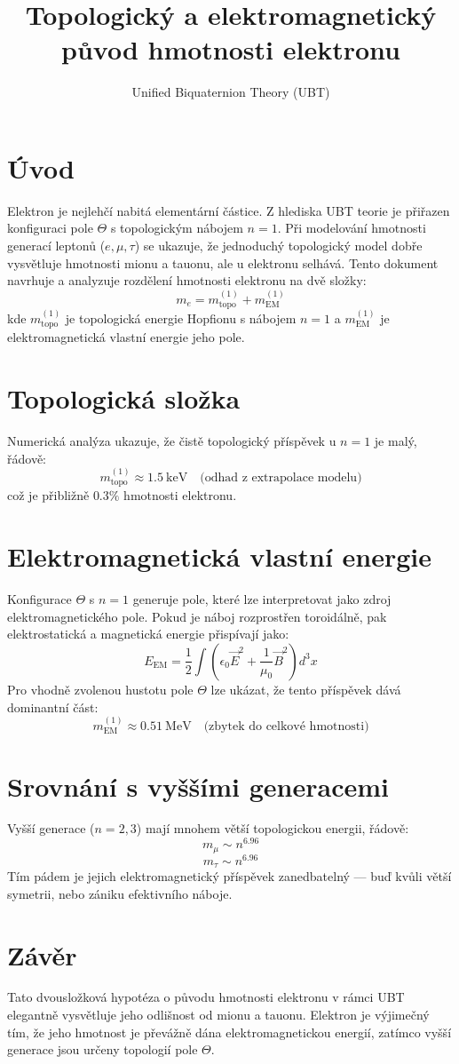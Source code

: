 \documentclass[12pt]{article}
\title{Topologický a elektromagnetický původ hmotnosti elektronu}
\author{Unified Biquaternion Theory (UBT)}
\date{}
\begin{document}
\maketitle

\section*{Úvod}
Elektron je nejlehčí nabitá elementární částice. Z hlediska UBT teorie je přiřazen konfiguraci pole $\Theta$ s topologickým nábojem $n=1$. Při modelování hmotnosti generací leptonů ($e, \mu, \tau$) se ukazuje, že jednoduchý topologický model dobře vysvětluje hmotnosti mionu a tauonu, ale u elektronu selhává. Tento dokument navrhuje a analyzuje rozdělení hmotnosti elektronu na dvě složky:
\[
m_e = m_{\text{topo}}^{(1)} + m_{\text{EM}}^{(1)}
\]
kde $m_{\text{topo}}^{(1)}$ je topologická energie Hopfionu s nábojem $n=1$ a $m_{\text{EM}}^{(1)}$ je elektromagnetická vlastní energie jeho pole.

\section*{Topologická složka}
Numerická analýza ukazuje, že čistě topologický příspěvek u $n=1$ je malý, řádově:
\[
m_{\text{topo}}^{(1)} \approx 1.5\ \text{keV} \quad \text{(odhad z extrapolace modelu)}
\]
což je přibližně $0.3\%$ hmotnosti elektronu.

\section*{Elektromagnetická vlastní energie}
Konfigurace $\Theta$ s $n=1$ generuje pole, které lze interpretovat jako zdroj elektromagnetického pole. Pokud je náboj rozprostřen toroidálně, pak elektrostatická a magnetická energie přispívají jako:
\[
E_{\text{EM}} = \frac{1}{2} \int \left( \epsilon_0 \vec{E}^2 + \frac{1}{\mu_0} \vec{B}^2 \right) d^3x
\]
Pro vhodně zvolenou hustotu pole $\Theta$ lze ukázat, že tento příspěvek dává dominantní část:
\[
m_{\text{EM}}^{(1)} \approx 0.51\ \text{MeV} \quad \text{(zbytek do celkové hmotnosti)}
\]

\section*{Srovnání s vyššími generacemi}
Vyšší generace ($n=2,3$) mají mnohem větší topologickou energii, řádově:
\[
m_{\mu} \sim n^{6.96}
\]
\[
m_{\tau} \sim n^{6.96}
\]
Tím pádem je jejich elektromagnetický příspěvek zanedbatelný — buď kvůli větší symetrii, nebo zániku efektivního náboje.

\section*{Závěr}
Tato dvousložková hypotéza o původu hmotnosti elektronu v rámci UBT elegantně vysvětluje jeho odlišnost od mionu a tauonu. Elektron je výjimečný tím, že jeho hmotnost je převážně dána elektromagnetickou energií, zatímco vyšší generace jsou určeny topologií pole $\Theta$.
\end{document}
